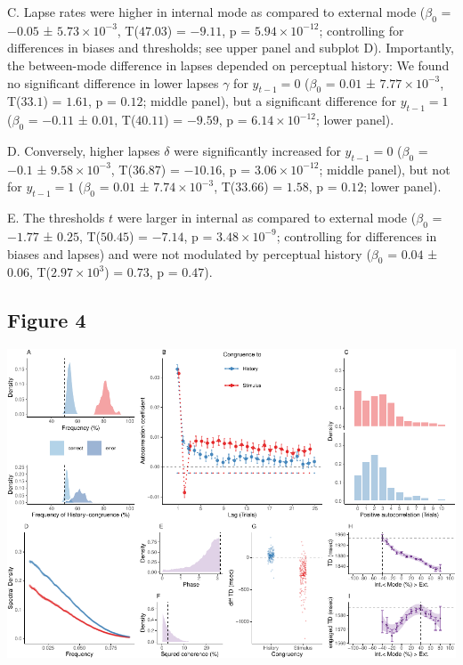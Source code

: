 \documentclass[
]{article}
\begin{document}
C. Lapse rates were higher in internal mode as compared to external mode
(\(\beta_0\) = \(-0.05\) ± \(\ensuremath{5.73\times 10^{-3}}\),
T(\(47.03\)) = \(-9.11\), p = \(\ensuremath{5.94\times 10^{-12}}\);
controlling for differences in biases and thresholds; see upper panel
and subplot D). Importantly, the between-mode difference in lapses
depended on perceptual history: We found no significant difference in
lower lapses \(\gamma\) for \(y_{t-1} = 0\) (\(\beta_0\) = \(0.01\) ±
\(\ensuremath{7.77\times 10^{-3}}\), T(\(33.1\)) = \(1.61\), p =
\(0.12\); middle panel), but a significant difference for
\(y_{t-1} = 1\) (\(\beta_0\) = \(-0.11\) ± \(0.01\), T(\(40.11\)) =
\(-9.59\), p = \(\ensuremath{6.14\times 10^{-12}}\); lower panel).

D. Conversely, higher lapses \(\delta\) were significantly increased for
\(y_{t-1} = 0\) (\(\beta_0\) = \(-0.1\) ±
\(\ensuremath{9.58\times 10^{-3}}\), T(\(36.87\)) = \(-10.16\), p =
\(\ensuremath{3.06\times 10^{-12}}\); middle panel), but not for
\(y_{t-1} = 1\) (\(\beta_0\) = \(0.01\) ±
\(\ensuremath{7.74\times 10^{-3}}\), T(\(33.66\)) = \(1.58\), p =
\(0.12\); lower panel).

E. The thresholds \(t\) were larger in internal as compared to external
mode (\(\beta_0\) = \(-1.77\) ± \(0.25\), T(\(50.45\)) = \(-7.14\), p =
\(\ensuremath{3.48\times 10^{-9}}\); controlling for differences in
biases and lapses) and were not modulated by perceptual history
(\(\beta_0\) = \(0.04\) ± \(0.06\),
T(\(\ensuremath{2.97\times 10^{3}}\)) = \(0.73\), p = \(0.47\)).

\newpage

\hypertarget{figure-4}{%
\subsection{Figure 4}\label{figure-4}}

\includegraphics{modes_mouse_files/figure-latex/Figure_4-1.pdf}
\end{document}
